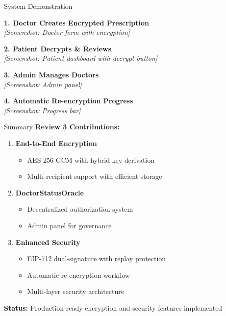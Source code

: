 \documentclass[10pt]{beamer}
\begin{document}
\begin{frame}{System Demonstration}
\begin{center}
\textbf{1. Doctor Creates Encrypted Prescription}\\
\textit{[Screenshot: Doctor form with encryption]}

\vspace{0.3cm}
\textbf{2. Patient Decrypts \& Reviews}\\
\textit{[Screenshot: Patient dashboard with decrypt button]}

\vspace{0.3cm}
\textbf{3. Admin Manages Doctors}\\
\textit{[Screenshot: Admin panel]}

\vspace{0.3cm}
\textbf{4. Automatic Re-encryption Progress}\\
\textit{[Screenshot: Progress bar]}
\end{center}
\end{frame}

\begin{frame}{Summary}
\textbf{Review 3 Contributions:}

\begin{enumerate}
\item \textbf{End-to-End Encryption}
    \begin{itemize}
    \item AES-256-GCM with hybrid key derivation
    \item Multi-recipient support with efficient storage
    \end{itemize}

\item \textbf{DoctorStatusOracle}
    \begin{itemize}
    \item Decentralized authorization system
    \item Admin panel for governance
    \end{itemize}

\item \textbf{Enhanced Security}
    \begin{itemize}
    \item EIP-712 dual-signature with replay protection
    \item Automatic re-encryption workflow
    \item Multi-layer security architecture
    \end{itemize}
\end{enumerate}

\vspace{0.3cm}
\textbf{Status:} Production-ready encryption and security features implemented
\end{frame}
\end{document}
